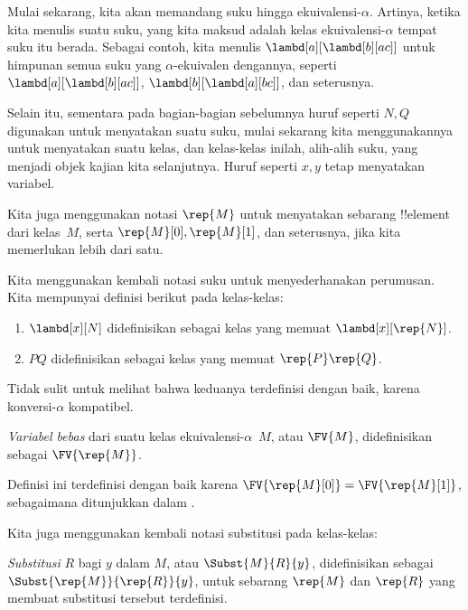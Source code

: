 \documentclass[../../../include/open-logic-section]{subfiles}
\begin{document}

Mulai sekarang, kita akan memandang suku hingga ekuivalensi-$\alpha$. Artinya,
ketika kita menulis suatu suku, yang kita maksud adalah kelas
ekuivalensi-$\alpha$ tempat suku itu berada. Sebagai contoh, kita menulis
$\lambd[a][\lambd[b][a c]]$ untuk himpunan semua suku yang $\alpha$-ekuivalen
dengannya, seperti $\lambd[a][\lambd[b][a c]]$,
$\lambd[b][\lambd[a][b c]]$, dan seterusnya.

Selain itu, sementara pada bagian-bagian sebelumnya huruf seperti $N, Q$
digunakan untuk menyatakan suatu suku, mulai sekarang kita menggunakannya
untuk menyatakan suatu kelas, dan kelas-kelas inilah, alih-alih suku, yang
menjadi objek kajian kita selanjutnya. Huruf seperti $x, y$ tetap menyatakan
variabel.

Kita juga menggunakan notasi $\rep{M}$ untuk menyatakan sebarang
!!{element} dari kelas~$M$, serta $\rep{M}[0], \rep{M}[1]$, dan seterusnya,
jika kita memerlukan lebih dari satu.

Kita menggunakan kembali notasi suku untuk menyederhanakan perumusan. Kita
mempunyai definisi berikut pada kelas-kelas:
\begin{defn}
  \begin{enumerate}
  \item $\lambd[x][N]$ didefinisikan sebagai kelas yang memuat
    $\lambd[x][\rep{N}]$.
  \item $PQ$ didefinisikan sebagai kelas yang memuat $\rep{P}\rep{Q}$.
  \end{enumerate}
\end{defn}

Tidak sulit untuk melihat bahwa keduanya terdefinisi dengan baik, karena
konversi-$\alpha$ kompatibel.

\begin{defn} 
  \emph{Variabel bebas} dari suatu kelas ekuivalensi-$\alpha$~$M$, atau
  $\FV{M}$, didefinisikan sebagai $\FV{\rep{M}}$.
\end{defn}

Definisi ini terdefinisi dengan baik karena $\FV{\rep{M}[0]} =
\FV{\rep{M}[1]}$, sebagaimana ditunjukkan dalam .

Kita juga menggunakan kembali notasi substitusi pada kelas-kelas:
\begin{defn} 
  \emph{Substitusi} $R$ bagi $y$ dalam $M$, atau $\Subst{M}{R}{y}$,
  didefinisikan sebagai $\Subst{\rep{M}}{\rep{R}}{y}$, untuk sebarang
  $\rep{M}$ dan $\rep{R}$ yang membuat substitusi tersebut terdefinisi.
\end{defn}
\end{document}
